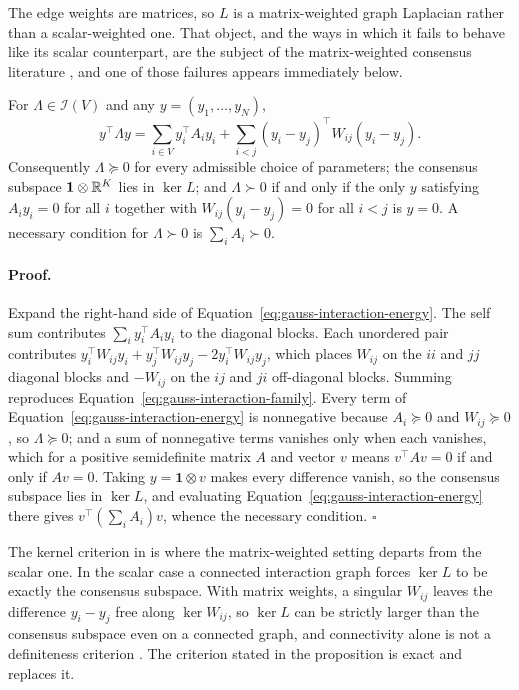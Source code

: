 The edge weights are matrices, so $L$ is a matrix-weighted graph Laplacian rather than a scalar-weighted one. That object, and the ways in which it fails to behave like its scalar counterpart, are the subject of the matrix-weighted consensus literature \citep{Trinh2018MatrixWeighted}, and one of those failures appears immediately below.

For $\Lambda\in\mathcal I(V)$ and any $y=(y_1,\dots,y_N)$,
\begin{equation}
y^\top\Lambda y
=\sum_{i\in V}y_i^\top A_iy_i
+\sum_{i<j}\left(y_i-y_j\right)^\top W_{ij}\left(y_i-y_j\right).
\label{eq:gauss-interaction-energy}
\end{equation}
Consequently $\Lambda\succeq0$ for every admissible choice of parameters; the consensus subspace $\mathbf 1\otimes\mathbb R^{K}$ lies in $\ker L$; and $\Lambda\succ0$ if and only if the only $y$ satisfying $A_iy_i=0$ for all $i$ together with $W_{ij}(y_i-y_j)=0$ for all $i<j$ is $y=0$. A necessary condition for $\Lambda\succ0$ is $\sum_iA_i\succ0$. 

\paragraph{Proof.}
Expand the right-hand side of Equation~\eqref{eq:gauss-interaction-energy}. The self sum contributes $\sum_iy_i^\top A_iy_i$ to the diagonal blocks. Each unordered pair contributes $y_i^\top W_{ij}y_i+y_j^\top W_{ij}y_j-2y_i^\top W_{ij}y_j$, which places $W_{ij}$ on the $ii$ and $jj$ diagonal blocks and $-W_{ij}$ on the $ij$ and $ji$ off-diagonal blocks. Summing reproduces Equation~\eqref{eq:gauss-interaction-family}. Every term of Equation~\eqref{eq:gauss-interaction-energy} is nonnegative because $A_i\succeq0$ and $W_{ij}\succeq0$, so $\Lambda\succeq0$; and a sum of nonnegative terms vanishes only when each vanishes, which for a positive semidefinite matrix $A$ and vector $v$ means $v^\top Av=0$ if and only if $Av=0$. Taking $y=\mathbf 1\otimes v$ makes every difference vanish, so the consensus subspace lies in $\ker L$, and evaluating Equation~\eqref{eq:gauss-interaction-energy} there gives $v^\top(\sum_iA_i)v$, whence the necessary condition. $\square$

The kernel criterion in  is where the matrix-weighted setting departs from the scalar one. In the scalar case a connected interaction graph forces $\ker L$ to be exactly the consensus subspace. With matrix weights, a singular $W_{ij}$ leaves the difference $y_i-y_j$ free along $\ker W_{ij}$, so $\ker L$ can be strictly larger than the consensus subspace even on a connected graph, and connectivity alone is not a definiteness criterion \citep{Trinh2018MatrixWeighted}. The criterion stated in the proposition is exact and replaces it.

